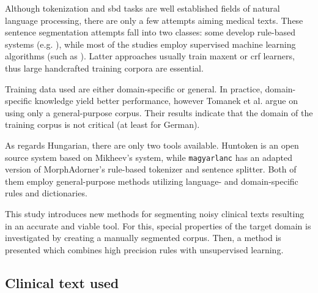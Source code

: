 Although tokenization and \acrshort{sbd} tasks are well established fields of natural language processing, there are only a few attempts aiming medical texts. 
These sentence segmentation attempts fall into two classes: some develop rule-based systems (e.g. \cite{XuSDJWD10}), while most of the studies employ supervised machine learning algorithms (such as \cite{apostolova2009automatic,cho2002text,Savova2010,taira2001automatic,tomanek2007sentence}).
Latter approaches usually train \acrlong{maxent} or \acrshort{crf} learners, thus large handcrafted training corpora are essential. 

Training data used are either domain-specific or general. 
In practice, domain-specific knowledge yield better performance, however Tomanek et al.  \cite{tomanek2006reappraisal} argue on using only a general-purpose corpus. 
Their results indicate that the domain of the training corpus is not critical (at least for German).

As regards Hungarian, there are only two tools available. 
Huntoken \cite{Halacsy2004} is an open source system based on Mikheev’s system, while \texttt{magyarlanc} \cite{zsibrata2013magyarlanc} has an adapted version of MorphAdorner’s rule-based tokenizer \cite{kumar2009monk} and sentence splitter. 
Both of them employ general-purpose methods utilizing language- and domain-specific rules and dictionaries.

This study introduces new methods for segmenting noisy clinical texts resulting in an accurate and viable tool.
For this, special properties of the target domain is investigated by creating a manually segmented corpus. 
Then, a method is presented which combines high precision rules with unsupervised learning.

\subsection{Clinical text used}
\label{sec:clin_corpus}


